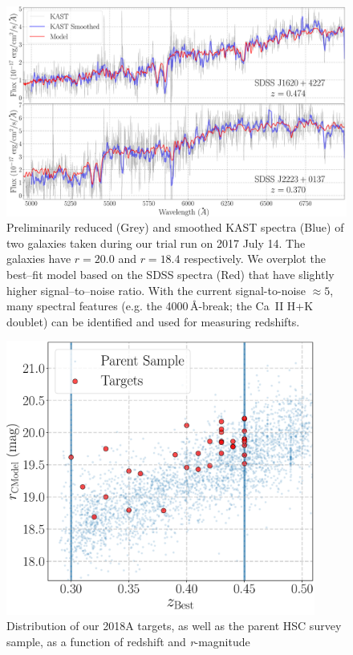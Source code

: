 \documentclass[letterpaper,12pt]{article}
\begin{document}
\begin{figure}[hbt]
\includegraphics[width=\textwidth]{specz_fig1.pdf}
\caption{
Preliminarily reduced (Grey) and smoothed KAST spectra (Blue) of two galaxies 
taken during our trial run on 2017 July 14. 
The galaxies have $r=20.0$ and $r=18.4$ respectively. 
We overplot the best--fit model based on the SDSS spectra (Red) that have 
slightly higher signal--to--noise ratio. 
With the current signal-to-noise $\approx5$, many spectral features (e.g. 
the 4000\,\AA-break; the Ca~II H+K doublet) can be identified and used for 
measuring redshifts.}
\label{spectrum}
\end{figure}

\begin{figure}
\includegraphics[width=4in]{s16a_massive_photoz_pair_gama_kast_targets.pdf}
\caption{
Distribution of our 2018A targets, as well as the parent HSC survey sample, as a function of redshift and {\it r}-magnitude}
\end{figure}
\end{document}
